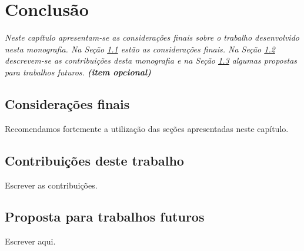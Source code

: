 \chapter{Conclusão}

\begin{flushright}
	\begin{minipage}{14.0cm}
			\setlength{\parindent}{0cm}
			\textit{Neste capítulo apresentam-se as considerações finais sobre o trabalho desenvolvido nesta monografia. Na Seção \ref{sec:consideracoes_finais} estão as considerações finais. Na Seção \ref{sec:contribuicoes_trabalho} descrevem-se as contribuições desta monografia e na Seção \ref{sec:proposta_trabalhos_futuros} algumas propostas para trabalhos futuros. \textbf{(item opcional)}}
	\end{minipage}
\end{flushright}

\section{Considerações finais}\label{sec:consideracoes_finais}
Recomendamos fortemente a utilização das seções apresentadas neste capítulo.

\section{Contribuições deste trabalho}\label{sec:contribuicoes_trabalho}
Escrever as contribuições.

\section{Proposta para trabalhos futuros}\label{sec:proposta_trabalhos_futuros}
Escrever aqui.